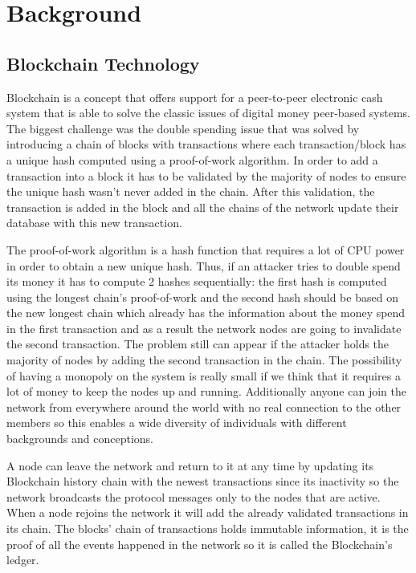 \chapter{Background}
\label{chapter:chapter1}

\section{Blockchain Technology}
\label{sec:chapter1-section1}

Blockchain is a concept that offers support for a peer-to-peer electronic cash system that is able to solve the classic issues of digital money peer-based systems. The biggest challenge was the double spending issue that was solved by introducing a chain of blocks with transactions where each transaction/block has a unique hash computed using a proof-of-work algorithm. In order to add a transaction into a block it has to be validated by the majority of nodes to ensure the unique hash wasn't never added in the chain. After this validation, the transaction is added in the block and all the chains of the network update their database with this new transaction. 

The proof-of-work algorithm is a hash function that requires a lot of CPU power in order to obtain a new unique hash. Thus, if an attacker tries to double spend its money it has to compute 2 hashes sequentially: the first hash is computed using the longest chain's proof-of-work and the second hash should be based on the new longest chain which already has the information about the money spend in the first transaction and as a result the network nodes are going to invalidate the second transaction. The problem still can appear if the attacker holds the majority of nodes by adding the second transaction in the chain. The possibility of having a monopoly on the system is really small if we think that it requires a lot of money to keep the nodes up and running. Additionally anyone can join the network from everywhere around the world with no real connection to the other members so this enables a wide diversity of individuals with different backgrounds and conceptions.

A node can leave the network and return to it at any time by updating its Blockchain history chain with the newest transactions since its inactivity so the network broadcasts the protocol messages only to the nodes that are active. When a node rejoins the network it will add the already validated transactions in its chain. The blocks' chain of transactions holds immutable information, it is the proof of all the events happened in the network so it is called the Blockchain's ledger.

